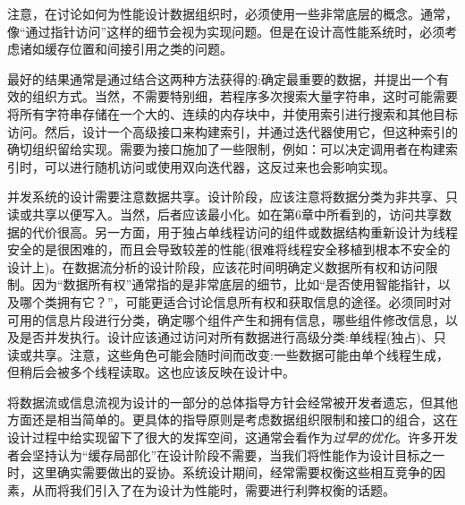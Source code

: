 注意，在讨论如何为性能设计数据组织时，必须使用一些非常底层的概念。通常，像“通过指针访问”这样的细节会视为实现问题。但是在设计高性能系统时，必须考虑诸如缓存位置和间接引用之类的问题。 

最好的结果通常是通过结合这两种方法获得的:确定最重要的数据，并提出一个有效的组织方式。当然，不需要特别细，若程序多次搜索大量字符串，这时可能需要将所有字符串存储在一个大的、连续的内存块中，并使用索引进行搜索和其他目标访问。然后，设计一个高级接口来构建索引，并通过迭代器使用它，但这种索引的确切组织留给实现。需要为接口施加了一些限制，例如：可以决定调用者在构建索引时，可以进行随机访问或使用双向迭代器，这反过来也会影响实现。 

并发系统的设计需要注意数据共享。设计阶段，应该注意将数据分类为非共享、只读或共享以便写入。当然，后者应该最小化。如在第6章中所看到的，访问共享数据的代价很高。另一方面，用于独占单线程访问的组件或数据结构重新设计为线程安全的是很困难的，而且会导致较差的性能(很难将线程安全移植到根本不安全的设计上)。在数据流分析的设计阶段，应该花时间明确定义数据所有权和访问限制。因为“数据所有权”通常指的是非常底层的细节，比如“是否使用智能指针，以及哪个类拥有它？”，可能更适合讨论信息所有权和获取信息的途径。必须同时对可用的信息片段进行分类，确定哪个组件产生和拥有信息，哪些组件修改信息，以及是否并发执行。设计应该通过访问对所有数据进行高级分类:单线程(独占)、只读或共享。注意，这些角色可能会随时间而改变:一些数据可能由单个线程生成，但稍后会被多个线程读取。这也应该反映在设计中。 

将数据流或信息流视为设计的一部分的总体指导方针会经常被开发者遗忘，但其他方面还是相当简单的。更具体的指导原则是考虑数据组织限制和接口的组合，这在设计过程中给实现留下了很大的发挥空间，这通常会看作为\textit{过早的优化}。许多开发者会坚持认为“缓存局部化”在设计阶段不需要，当我们将性能作为设计目标之一时，这里确实需要做出的妥协。系统设计期间，经常需要权衡这些相互竞争的因素，从而将我们引入了在为设计为性能时，需要进行利弊权衡的话题。



































